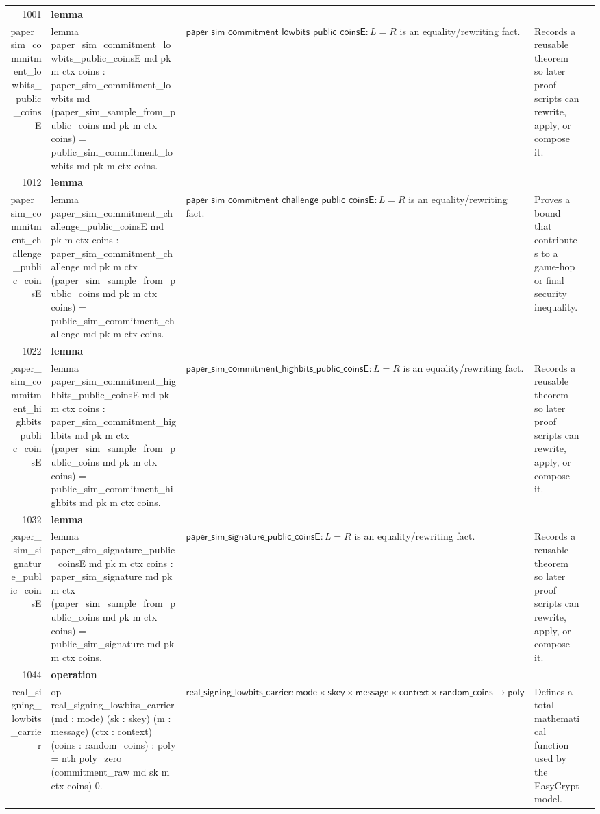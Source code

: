 \documentclass[10pt]{article}
\newcommand{\ec}[1]{\begingroup\ttfamily\scriptsize #1\endgroup}
\begin{document}
\begin{longtable}{r L{0.17\textwidth} L{0.26\textwidth} L{0.27\textwidth} L{0.20\textwidth}}
1001 & \textbf{lemma}\\\ec{paper\_sim\_commitment\_lowbits\_public\_coinsE} & \ec{lemma paper\_sim\_commitment\_lowbits\_public\_coinsE md pk m ctx coins : paper\_sim\_commitment\_lowbits md (paper\_sim\_sample\_from\_public\_coins md pk m ctx coins) = public\_sim\_commitment\_lowbits md pk m ctx coins.} & \(\mathsf{paper\_sim\_commitment\_lowbits\_public\_coinsE} : L = R\) is an equality/rewriting fact. & Records a reusable theorem so later proof scripts can rewrite, apply, or compose it. \\
1012 & \textbf{lemma}\\\ec{paper\_sim\_commitment\_challenge\_public\_coinsE} & \ec{lemma paper\_sim\_commitment\_challenge\_public\_coinsE md pk m ctx coins : paper\_sim\_commitment\_challenge md pk m ctx (paper\_sim\_sample\_from\_public\_coins md pk m ctx coins) = public\_sim\_commitment\_challenge md pk m ctx coins.} & \(\mathsf{paper\_sim\_commitment\_challenge\_public\_coinsE} : L = R\) is an equality/rewriting fact. & Proves a bound that contributes to a game-hop or final security inequality. \\
1022 & \textbf{lemma}\\\ec{paper\_sim\_commitment\_highbits\_public\_coinsE} & \ec{lemma paper\_sim\_commitment\_highbits\_public\_coinsE md pk m ctx coins : paper\_sim\_commitment\_highbits md pk m ctx (paper\_sim\_sample\_from\_public\_coins md pk m ctx coins) = public\_sim\_commitment\_highbits md pk m ctx coins.} & \(\mathsf{paper\_sim\_commitment\_highbits\_public\_coinsE} : L = R\) is an equality/rewriting fact. & Records a reusable theorem so later proof scripts can rewrite, apply, or compose it. \\
1032 & \textbf{lemma}\\\ec{paper\_sim\_signature\_public\_coinsE} & \ec{lemma paper\_sim\_signature\_public\_coinsE md pk m ctx coins : paper\_sim\_signature md pk m ctx (paper\_sim\_sample\_from\_public\_coins md pk m ctx coins) = public\_sim\_signature md pk m ctx coins.} & \(\mathsf{paper\_sim\_signature\_public\_coinsE} : L = R\) is an equality/rewriting fact. & Records a reusable theorem so later proof scripts can rewrite, apply, or compose it. \\
1044 & \textbf{operation}\\\ec{real\_signing\_lowbits\_carrier} & \ec{op real\_signing\_lowbits\_carrier (md : mode) (sk : skey) (m : message) (ctx : context) (coins : random\_coins) : poly = nth poly\_zero (commitment\_raw md sk m ctx coins) 0.} & \(\mathsf{real\_signing\_lowbits\_carrier} : \mathsf{mode} \times \mathsf{skey} \times \mathsf{message} \times \mathsf{context} \times \mathsf{random\_coins} \to \mathsf{poly}\) & Defines a total mathematical function used by the EasyCrypt model. \\

\end{longtable}
\end{document}
